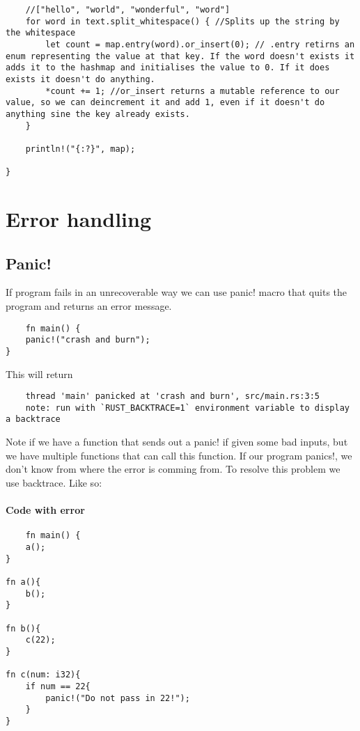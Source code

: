 \begin{lstlisting}
    //["hello", "world", "wonderful", "word"]
    for word in text.split_whitespace() { //Splits up the string by the whitespace
        let count = map.entry(word).or_insert(0); // .entry retirns an enum representing the value at that key. If the word doesn't exists it adds it to the hashmap and initialises the value to 0. If it does exists it doesn't do anything.
        *count += 1; //or_insert returns a mutable reference to our value, so we can deincrement it and add 1, even if it doesn't do anything sine the key already exists.
    }

    println!("{:?}", map);

}
\end{lstlisting}

\section{Error handling}

\subsection{Panic!}
If program fails in an unrecoverable way we can use panic! macro that quits the program and returns an error message.

\begin{lstlisting}
    fn main() {
    panic!("crash and burn");
}
\end{lstlisting}

This will return \begin{lstlisting}
    thread 'main' panicked at 'crash and burn', src/main.rs:3:5
    note: run with `RUST_BACKTRACE=1` environment variable to display a backtrace
\end{lstlisting}

Note if we have a function that sends out a panic! if given some bad inputs, but we have multiple functions that can call this function. If our program panics!, we don't know 
from where the error is comming from. To resolve this problem we use backtrace. 
Like so:

\paragraph*{Code with error}
\begin{lstlisting}
    fn main() {
    a();
}

fn a(){
    b();
}

fn b(){
    c(22);
}

fn c(num: i32){
    if num == 22{
        panic!("Do not pass in 22!");
    }
}
\end{lstlisting}

